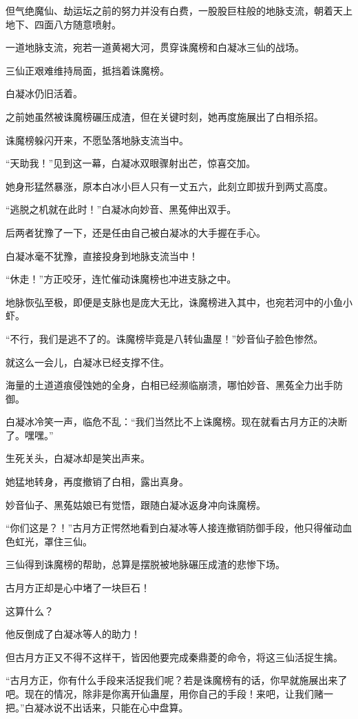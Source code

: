 \begin{this_body}
但气绝魔仙、劫运坛之前的努力并没有白费，一股股巨柱般的地脉支流，朝着天上地下、四面八方随意喷射。

一道地脉支流，宛若一道黄褐大河，贯穿诛魔榜和白凝冰三仙的战场。

三仙正艰难维持局面，抵挡着诛魔榜。

白凝冰仍旧活着。

之前她虽然被诛魔榜碾压成渣，但在关键时刻，她再度施展出了白相杀招。

诛魔榜躲闪开来，不愿坠落地脉支流当中。

“天助我！”见到这一幕，白凝冰双眼骤射出芒，惊喜交加。

她身形猛然暴涨，原本白冰小巨人只有一丈五六，此刻立即拔升到两丈高度。

“逃脱之机就在此时！”白凝冰向妙音、黑菟伸出双手。

后两者犹豫了一下，还是任由自己被白凝冰的大手握在手心。

白凝冰毫不犹豫，直接投身到地脉支流当中！

“休走！”方正咬牙，连忙催动诛魔榜也冲进支脉之中。

地脉恢弘至极，即便是支脉也是庞大无比，诛魔榜进入其中，也宛若河中的小鱼小虾。

“不行，我们是逃不了的。诛魔榜毕竟是八转仙蛊屋！”妙音仙子脸色惨然。

就这么一会儿，白凝冰已经支撑不住。

海量的土道道痕侵蚀她的全身，白相已经濒临崩溃，哪怕妙音、黑菟全力出手防御。

白凝冰冷笑一声，临危不乱：“我们当然比不上诛魔榜。现在就看古月方正的决断了。嘿嘿。”

生死关头，白凝冰却是笑出声来。

她猛地转身，再度撤销了白相，露出真身。

妙音仙子、黑菟姑娘已有觉悟，跟随白凝冰返身冲向诛魔榜。

“你们这是？！”古月方正愕然地看到白凝冰等人接连撤销防御手段，他只得催动血色虹光，罩住三仙。

三仙得到诛魔榜的帮助，总算是摆脱被地脉碾压成渣的悲惨下场。

古月方正却是心中堵了一块巨石！

这算什么？

他反倒成了白凝冰等人的助力！

但古月方正又不得不这样干，皆因他要完成秦鼎菱的命令，将这三仙活捉生擒。

“古月方正，你有什么手段来活捉我们呢？若是诛魔榜有的话，你早就施展出来了吧。现在的情况，除非是你离开仙蛊屋，用你自己的手段！来吧，让我们赌一把。”白凝冰说不出话来，只能在心中盘算。


\end{this_body}
